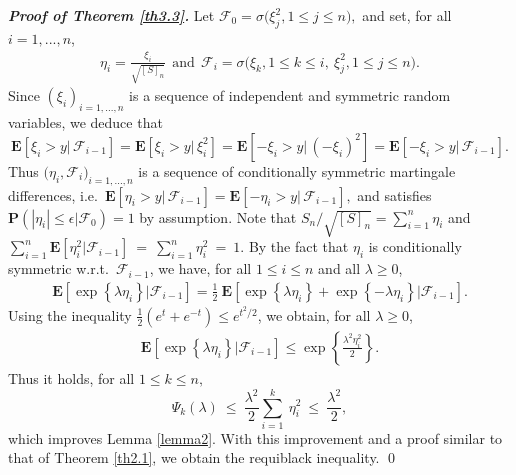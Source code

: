 \documentclass{gSTA2e}
\theoremstyle{plain}
\theoremstyle{definition}
\theoremstyle{remark}
\begin{document}
\noindent \emph{\textbf{Proof of Theorem \ref{th3.3}.}}
Let $\mathcal{F}_{0} = \sigma \Big( \xi_j^2, 1\leq j\leq n \Big),$ and set, for all $i=1,...,n$,
\begin{eqnarray}\label{dun87}
\eta_i= \frac{ \xi_i}{ \sqrt{[S]_n}}  \ \  \textrm{and}  \ \ \mathcal{F}_{i} = \sigma \Big( \xi_{k},  1\leq k\leq i,\  \xi_j^2, 1\leq j\leq n \Big).
\end{eqnarray}
Since  $(\xi _i)_{i=1,...,n}$ is a  sequence of independent and  symmetric random variables, we deduce that  $$ \mathbf{E}[\xi_i> y|\, \mathcal{F}_{i-1} ] = \mathbf{E}[\xi_i> y|\, \xi_i^2 ] =\mathbf{E}[ -\xi_i > y|\, (-\xi_i)^2 ]=\mathbf{E}[ -\xi_i > y|\, \mathcal{F}_{i-1}  ].$$
Thus $\big(\eta_i,\mathcal{F}_i\big)_{i=1,...,n}$ is a sequence of conditionally symmetric martingale differences, i.e.\ $ \mathbf{E}[\eta_i> y|\, \mathcal{F}_{i-1} ] =  \mathbf{E}[ -\eta_i > y|\, \mathcal{F}_{i-1}  ],$ and satisfies $\mathbf{P}(|\eta_i| \leq \epsilon | \mathcal{F}_{0} )=1$ by assumption.
Note that $S_n / \sqrt{[S]_n} = \sum_{i=1}^n \eta_i
$
and  $\sum_{i=1}^n \mathbf{E}[\eta_i^2| \mathcal{F}_{i-1} ]\  = \ \sum_{i=1}^n\eta_i^2 \ =\ 1.$
By the fact that $\eta_i$ is   conditionally symmetric w.r.t.\ $\mathcal{F}_{i-1}$,   we have, for all $1\leq i\leq n$ and all $\lambda\geq0$,
\begin{eqnarray*}
 \mathbf{E}\left[\exp\left\{\lambda \eta_i  \right\} \Big|  \mathcal{F}_{i-1} \right]  = \frac12 \ \mathbf{E}\left[\exp\left\{  \lambda \eta_i \right\} + \exp\left\{  -\lambda \eta_i \right\} \Big|  \mathcal{F}_{i-1}  \right].
\end{eqnarray*}
Using the inequality $\frac12(e^t+e^{-t}) \leq e^{t^2/2}$, we obtain, for all $\lambda\geq0$,
\begin{eqnarray*}
 \mathbf{E}\left[\exp\left\{ \lambda \eta_i \right\} \Big| \mathcal{F}_{i-1} \right]
  \leq  \exp\left\{\frac{\lambda^2 \eta_i^2}{2  } \right\}.
\end{eqnarray*}
Thus it holds, for all $1\leq k \leq n,$
\begin{equation}
\Psi _k(\lambda ) \ \leq \ \frac{\lambda^2}{2}\sum_{i=1}^k \ \eta_i^2 \  \leq \ \frac{\lambda^2}{2},
\end{equation}
which improves Lemma \ref{lemma2}. With this improvement and a proof similar to that of Theorem
\ref{th2.1}, we obtain the requiblack inequality. \hfill\qed


\appendix \label{assec}
\end{document}
